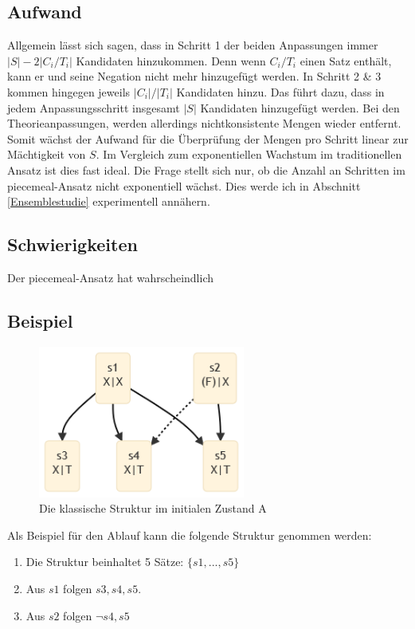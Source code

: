 \documentclass{article}
\begin{document}
\subsection{Aufwand}
Allgemein lässt sich sagen, dass in Schritt 1 der beiden Anpassungen immer $\lvert S \rvert - 2\lvert C_i/T_i \rvert$ Kandidaten hinzukommen. Denn wenn $C_i/T_i$ einen Satz enthält, kann er und seine Negation nicht mehr hinzugefügt werden. In Schritt 2 \& 3 kommen hingegen jeweils $\lvert C_i \rvert / \lvert T_i \rvert$ Kandidaten hinzu. Das führt dazu, dass in jedem Anpassungsschritt insgesamt $\lvert S \rvert$ Kandidaten hinzugefügt werden. Bei den Theorieanpassungen, werden allerdings nichtkonsistente Mengen wieder entfernt. Somit wächst der Aufwand für die Überprüfung der Mengen pro Schritt linear zur Mächtigkeit von $S$. Im Vergleich zum exponentiellen Wachstum im traditionellen Ansatz ist dies fast ideal. Die Frage stellt sich nur, ob die Anzahl an Schritten im piecemeal-Ansatz nicht exponentiell wächst. Dies werde ich in Abschnitt \ref{Ensemblestudie} experimentell annähern.

\subsection{Schwierigkeiten}
Der piecemeal-Ansatz hat wahrscheindlich


\subsection{Beispiel}
\begin{figure}[ht]
  \centering
  \includegraphics[width=\textwidth,height=5cm,keepaspectratio]{images/reduced_classical.png}
  \caption{Die klassische Struktur im initialen Zustand A\label{fig:classset-initial1}}
\end{figure}

 Als Beispiel für den Ablauf kann die folgende Struktur genommen werden:
 \begin{enumerate}
     \item Die Struktur beinhaltet 5 Sätze: $\{s1,...,s5\}$
     \item Aus $s1$ folgen $s3, s4, s5$.
     \item Aus $s2$ folgen $\neg s4, s5$
 \end{enumerate}
 
\end{document}
